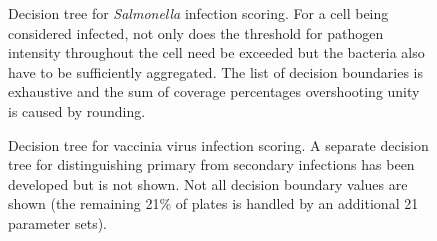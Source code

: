\begin{figure}
  \centering

  \vspace{5mm}
  \footnotesize
  

  \vspace{5mm}
  \caption[Decision tree for \textit{Salmonella} infection scoring.]{Decision tree for \textit{Salmonella} infection scoring. For a cell being considered infected, not only does the threshold for pathogen intensity throughout the cell need be exceeded but the bacteria also have to be sufficiently aggregated. The list of decision boundaries is exhaustive and the sum of coverage percentages overshooting unity is caused by rounding.}
  \label{fig:dectree-salmonella}
\end{figure}

\begin{figure}
  \centering

  \vspace{5mm}
  \footnotesize
  

  \vspace{5mm}
  \caption[Decision tree for vaccinia virus infection scoring.]{Decision tree for vaccinia virus infection scoring. A separate decision tree for distinguishing primary from secondary infections has been developed but is not shown. Not all decision boundary values are shown (the remaining 21\% of plates is handled by an additional 21 parameter sets).}
\end{figure}
